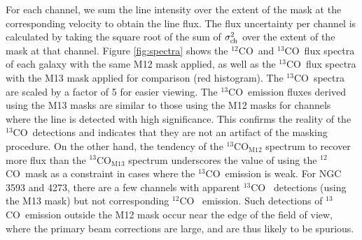 \documentclass{emulateapj}
\def\ttco{\mbox{$^{13}$CO}}
\def\twco{\mbox{$^{12}$CO}}
\begin{document}
For each channel, we sum the line intensity over the extent of the mask 
at the corresponding velocity to obtain the line flux. 
The flux uncertainty per channel is 
calculated by taking the square root of the sum of $\sigma_{\rm ch}^2$ over 
the extent of the mask at that channel. 
Figure \ref{fig:spectra} shows the \twco\ and \ttco\ flux spectra
of each galaxy with the same M12 mask applied, 
as well as the \ttco\ flux spectra with the M13 mask applied for comparison (red histogram).
The \ttco\ spectra are scaled by a factor of 5 for easier viewing.
The \ttco \ emission fluxes derived using the M13 masks are similar to 
those using the M12 masks for channels where the line is detected with high significance.
This confirms the reality of the \ttco\ detections and indicates that 
they are not an artifact of the masking procedure.
On the other hand, the tendency of the \ttco$_{\mathrm M12}$ spectrum 
to recover more flux than the \ttco$_{\mathrm M13}$ spectrum underscores 
the value of using the \twco\ mask as a constraint in cases where the \ttco\ emission is weak.
For NGC 3593 and 4273, there are a few channels with apparent \ttco
\ detections (using the M13 mask) but not corresponding \twco
\ emission.  
Such detections of \ttco \ emission outside the 
M12 mask occur near the edge of the field of view, 
where the primary beam corrections are large, and are thus 
likely to be spurious. 
\end{document}
